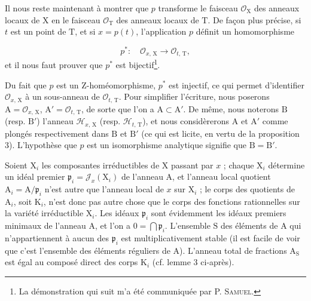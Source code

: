 Il nous reste maintenant à montrer que $p$ transforme le faisceau $\mathcal{O}_\mathrm{X}$ des anneaux locaux de $\mathrm{X}$ en le faisceau $\mathcal{O}_\mathrm{T}$ des anneaux locaux de $\mathrm{T}$. De façon plus précise, si $t$ est un point de $\mathrm{T}$, et si $x = p(t)$, l'application $p$ définit un homomorphisme

\begin{equation*}
p^* : \quad \mathcal{O}_{x,\, \mathrm{X}} \longrightarrow \mathcal{O}_{t,\, \mathrm{T}},
\end{equation*}
et il nous faut prouver que $p^*$ est bijectif\footnote{La démonstration qui suit m'a été communiquée par P. \textsc{Samuel}.}.



Du fait que $p$ est un Z-homéomorphisme, $p^*$ est injectif, ce qui permet d'identifier $\mathcal{O}_{x,\, \mathrm{X}}$ à un sous-anneau de $\mathcal{O}_{t,\, \mathrm{T}}$. Pour simplifier l'écriture, nous poserons $\mathrm{A} = \mathcal{O}_{x,\, \mathrm{X}}$, $\mathrm{A}' = \mathcal{O}_{t,\, \mathrm{T}}$, de sorte que l'on a $\mathrm{A} \subset \mathrm{A}'$. De même, nous noterons $\mathrm{B}$ (resp. $\mathrm{B}'$) l'anneau $\mathcal{H}_{x,\, \mathrm{X}}$ (resp. $\mathcal{H}_{t,\, \mathrm{T}}$), et nous considèrerons $\mathrm{A}$ et $\mathrm{A}'$ comme plongés respectivement dans $\mathrm{B}$ et $\mathrm{B}'$ (ce qui est licite, en vertu de la proposition 3). L'hypothèse que $p$ est un isomorphisme analytique signifie que $\mathrm{B} = \mathrm{B}'$.

Soient $\mathrm{X}_i$ les composantes irréductibles de $\mathrm{X}$ passant par $x$ ; chaque $\mathrm{X}_i$ détermine un idéal premier $\mathfrak{p}_i = \mathcal{J}_x(\mathrm{X}_i)$ de l'anneau $\mathrm{A}$, et l'anneau local quotient $\mathrm{A}_i = \mathrm{A}/\mathfrak{p}_i$ n'est autre que l'anneau local de $x$ sur $\mathrm{X}_i$ ; le corps des quotients de $\mathrm{A}_i$, soit $\mathrm{K}_i$, n'est donc pas autre chose que le corps des fonctions rationnelles sur la variété irréductible $\mathrm{X}_i$. Les idéaux $\mathfrak{p}_i$ sont évidemment les idéaux premiers minimaux de l'anneau $\mathrm{A}$, et l'on a $0 = \bigcap \mathfrak{p}_i$. L'ensemble $\mathrm{S}$ des éléments de $\mathrm{A}$ qui n'appartiennent à aucun des $\mathfrak{p}_i$ est multiplicativement stable (il est facile de voir que c'est l'ensemble des éléments réguliers de $\mathrm{A}$). L'anneau total de fractions $\mathrm{A}_\mathrm{S}$ est égal au composé direct des corps $\mathrm{K}_i$ (cf. lemme 3 ci-après).

